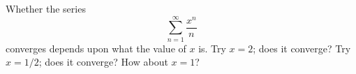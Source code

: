 Whether the series
  $$\sum_{n=1}^\infty \frac{x^n}{n}$$
converges depends upon what the value of $x$ is.  Try $x=2$; does it converge?  Try $x=1/2$; does it converge?  How about $x=1$?
